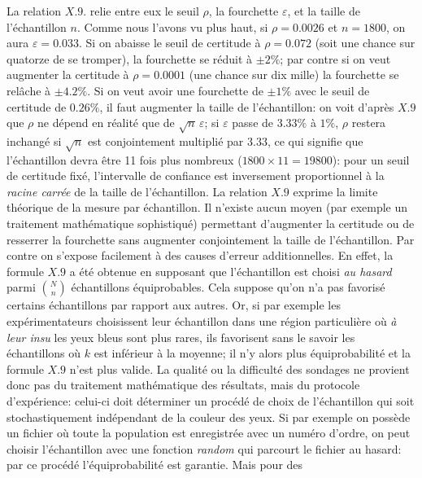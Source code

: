 La relation $X.9.$ relie entre eux le seuil $\rho$, la fourchette 
$\varepsilon$,  et la taille de l'\'echantillon $n$.  Comme nous l'avons
vu plus haut,  si $\rho = 0.0026$ et $n = 1800$,  on aura $\varepsilon =
0.033$. Si on abaisse le seuil de certitude \`a $\rho = 0.072$ (soit une 
chance sur quatorze de se tromper), la fourchette se r\'eduit \`a $\pm 
2\%$;  par contre si on veut augmenter la certitude \`a $\rho = 0.0001$ 
(une chance sur dix mille) la fourchette se rel\^ache \`a $\pm 4.2\%$. 
Si on veut avoir une fourchette de $\pm 1\%$ avec le seuil de certitude 
de $0.26\%$, il faut augmenter la taille de l'\'echantillon: on voit 
d'apr\`es $X.9$ que $\rho$ ne d\'epend en r\'ealit\'e que de $\sqrt{n}\, 
\varepsilon$; si $\varepsilon$ passe de $3.33\%$ \`a $1\%$, $\rho$ 
restera inchang\'e si $\sqrt{n}$ est conjointement multipli\'e par 
$3.33$, ce qui signifie que l'\'echantillon devra \^etre 11 fois plus 
nombreux ($1800 \times 11 = 19800$): pour un seuil de certitude 
fix\'e, l'intervalle de confiance est inversement proportionnel \`a 
la {\it racine carr\'ee} de la taille de l'\'echantillon. 
\medskip 
La relation $X.9$ exprime la limite th\'eorique de la mesure par 
\'echan\-til\-lon. Il n'existe aucun moyen (par exemple un traitement 
math\'e\-ma\-ti\-que sophistiqu\'e) permettant d'augmenter la
certitude ou de resserrer la four\-chette sans augmenter conjointement 
la taille de l'\'echantillon. Par contre on s'expose facilement \`a des 
causes d'erreur additionnelles. En effet, la formule $X.9$ a \'et\'e 
obtenue en supposant que l'\'echantillon est choisi {\it au hasard} parmi 
${N \choose n}$ \'echantillons \'equiprobables. Cela suppose qu'on n'a
pas favoris\'e certains \'echantillons par rapport aux autres.  Or,  si par 
exemple les exp\'erimentateurs choisissent leur \'echantillon dans une 
r\'egion particuli\`ere o\`u {\it \`a leur insu} les yeux bleus sont plus 
rares, ils favorisent sans le savoir les \'echantillons o\`u $k$ est 
inf\'erieur \`a la moyenne; il n'y alors plus \'equiprobabilit\'e et la 
formule $X.9$ n'est plus valide.  La qualit\'e ou la difficult\'e des 
sondages ne provient donc pas du traitement math\'ematique des r\'esultats, 
mais du protocole d'exp\'erience: celui-ci doit d\'eterminer un proc\'ed\'e
de choix de l'\'echantillon qui soit stochastiquement ind\'ependant de la 
couleur des yeux. Si par exemple on poss\`ede un fichier o\`u toute la 
population est enregistr\'ee avec un num\'ero d'ordre, on peut choisir 
l'\'echantillon avec une fonction {\it random} qui parcourt le fichier au 
hasard: par ce proc\'ed\'e l'\'equiprobabilit\'e est garantie. Mais pour des 
